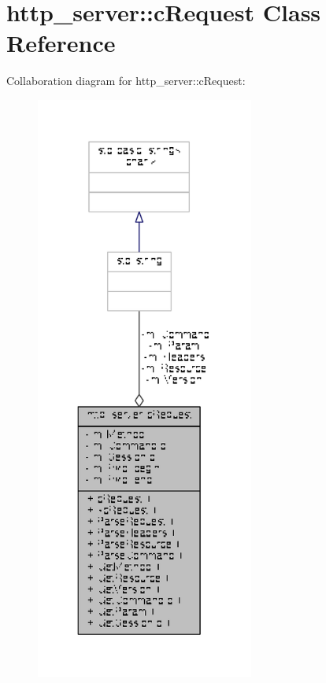 \hypertarget{classhttp__server_1_1cRequest}{\section{http\-\_\-server\-:\-:c\-Request Class Reference}
\label{classhttp__server_1_1cRequest}
}


Collaboration diagram for http\-\_\-server\-:\-:c\-Request\-:
\nopagebreak
\begin{figure}[H]
\begin{center}
\leavevmode
\includegraphics[height=550pt]{classhttp__server_1_1cRequest__coll__graph}
\end{center}
\end{figure}
